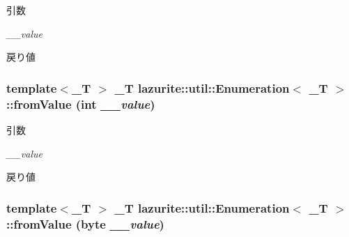 \begin{DoxyParams}{引数}
\item[{\em \_\-\_\-value}]\end{DoxyParams}
\begin{DoxyReturn}{戻り値}

\end{DoxyReturn}
\hypertarget{classlazurite_1_1util_1_1_enumeration_3_01___t_01_4_a2fd3755fc87c6a6fd4153425daacde97}{
\subsubsection[{fromValue}]{\setlength{\rightskip}{0pt plus 5cm}template$<$\_\-T $>$ \_\-T lazurite::util::Enumeration$<$ \_\-T $>$::fromValue (int {\em \_\-\_\-value})}}
\label{classlazurite_1_1util_1_1_enumeration_3_01___t_01_4_a2fd3755fc87c6a6fd4153425daacde97}

\begin{DoxyParams}{引数}
\item[{\em \_\-\_\-value}]\end{DoxyParams}
\begin{DoxyReturn}{戻り値}

\end{DoxyReturn}
\hypertarget{classlazurite_1_1util_1_1_enumeration_3_01___t_01_4_a9b48aa615cd8abff86b0bb93c3f79d38}{
\subsubsection[{fromValue}]{\setlength{\rightskip}{0pt plus 5cm}template$<$\_\-T $>$ \_\-T lazurite::util::Enumeration$<$ \_\-T $>$::fromValue (byte {\em \_\-\_\-value})}}
\label{classlazurite_1_1util_1_1_enumeration_3_01___t_01_4_a9b48aa615cd8abff86b0bb93c3f79d38}

